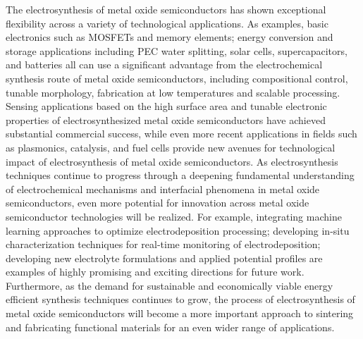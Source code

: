 \documentclass[12pt,a4paper]{report}
\begin{document}
	The electrosynthesis of metal oxide semiconductors has shown exceptional flexibility across a variety of technological applications. As examples, basic electronics such as MOSFETs and memory elements; energy conversion and storage applications including PEC water splitting, solar cells, supercapacitors, and batteries all can use a significant advantage from the electrochemical synthesis route of metal oxide semiconductors, including compositional control, tunable morphology, fabrication at low temperatures and scalable processing. Sensing applications based on the high surface area and tunable electronic properties of electrosynthesized metal oxide semiconductors have achieved substantial commercial success, while even more recent applications in fields such as plasmonics, catalysis, and fuel cells provide new avenues for technological impact of electrosynthesis of metal oxide semiconductors.
	As electrosynthesis techniques continue to progress through a deepening fundamental understanding of electrochemical mechanisms and interfacial phenomena in metal oxide semiconductors, even more potential for innovation across metal oxide semiconductor technologies will be realized. For example, integrating machine learning approaches to optimize electrodeposition processing; developing in-situ characterization techniques for real-time monitoring of electrodeposition; developing new electrolyte formulations and applied potential profiles are examples of highly promising and exciting directions for future work. Furthermore, as the demand for sustainable and economically viable energy efficient synthesis techniques continues to grow, the process of electrosynthesis of metal oxide semiconductors will become a more important approach to sintering and fabricating functional materials for an even wider range of applications.
	
	


	
	
\end{document}
